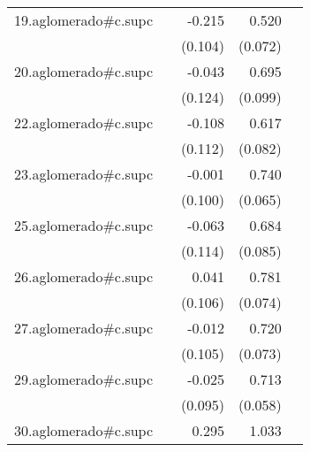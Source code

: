 {\begin{longtable}{l*{4}{D{.}{.}{-1}}}
\addlinespace
19.aglomerado#c.supc&                     &      -0.215\sym{*}  &       0.520\sym{***}&                     \\
            &                     &     (0.104)         &     (0.072)         &                     \\
\addlinespace
20.aglomerado#c.supc&                     &      -0.043         &       0.695\sym{***}&                     \\
            &                     &     (0.124)         &     (0.099)         &                     \\
\addlinespace
22.aglomerado#c.supc&                     &      -0.108         &       0.617\sym{***}&                     \\
            &                     &     (0.112)         &     (0.082)         &                     \\
\addlinespace
23.aglomerado#c.supc&                     &      -0.001         &       0.740\sym{***}&                     \\
            &                     &     (0.100)         &     (0.065)         &                     \\
\addlinespace
25.aglomerado#c.supc&                     &      -0.063         &       0.684\sym{***}&                     \\
            &                     &     (0.114)         &     (0.085)         &                     \\
\addlinespace
26.aglomerado#c.supc&                     &       0.041         &       0.781\sym{***}&                     \\
            &                     &     (0.106)         &     (0.074)         &                     \\
\addlinespace
27.aglomerado#c.supc&                     &      -0.012         &       0.720\sym{***}&                     \\
            &                     &     (0.105)         &     (0.073)         &                     \\
\addlinespace
29.aglomerado#c.supc&                     &      -0.025         &       0.713\sym{***}&                     \\
            &                     &     (0.095)         &     (0.058)         &                     \\
\addlinespace
30.aglomerado#c.supc&                     &       0.295\sym{**} &       1.033\sym{***}&                     \\

\end{longtable}}
